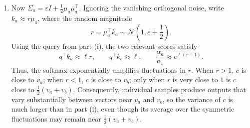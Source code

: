 \documentclass[11pt, a4paper, oneside]{article}
\begin{document}
\begin{enumerate}[label=(\alph*), left=0pt, labelsep=1em, itemsep=1em]
\begin{enumerate}[label=\roman*., left=0pt, labelsep=1em, itemsep=1em]
        $c\approx\frac12(v_a+v_b)$. To make the conditions on $\ell$ precise,
        first note that the random score perturbation $\delta_i^\top q$ is a
        linear projection of a Gaussian vector and is therefore Gaussian. Its
        mean and variance are
        \[
            \mathbb E[\delta_i^\top q]=0,
            \qquad
            \operatorname{Var}(\delta_i^\top q)
            =q^\top(\varepsilon I)q
            =\varepsilon\lVert q\rVert^2
            =2\varepsilon\ell^2,
        \]
        where $\lVert q\rVert^2=\ell^2\lVert\mu_a+\mu_b\rVert^2
        =2\ell^2$. Hence
        \[
            \delta_i^\top q\sim
            \mathcal N(0,2\varepsilon\ell^2),
        \]
        whose standard deviation is $\sqrt{2}\ell\sqrt{\varepsilon}$.
        We may thus choose
        \[
            \log(n-2)\ll\ell\ll\varepsilon^{-1/2}.
        \]
        The lower bound implies $e^\ell\gg n-2$, suppressing the total
        contribution of the irrelevant keys. The upper bound is equivalent to
        $\ell\sqrt{\varepsilon}\ll1$, ensuring that the random score
        perturbations are small and that the scores of $k_a$ and $k_b$ remain
        approximately equal.

        \item Now
        $\Sigma_a=\varepsilon I+\frac12\mu_a\mu_a^\top$. Ignoring the
        vanishing orthogonal noise, write $k_a\approx r\mu_a$, where the random
        magnitude
        \[
            r=\mu_a^\top k_a
            \sim\mathcal N\!\left(1,\varepsilon+\frac12\right).
        \]
        Using the query from part (i), the two relevant scores satisfy
        \[
            q^\top k_a\approx\ell r,
            \qquad q^\top k_b\approx\ell,
            \qquad
            \frac{\alpha_a}{\alpha_b}\approx e^{\ell(r-1)}.
        \]
        Thus, the softmax exponentially amplifies fluctuations in $r$. When
        $r>1$, $c$ is close to $v_a$; when $r<1$, $c$ is close to $v_b$; only
        when $r$ is very close to $1$ is $c$ close to
        $\frac12(v_a+v_b)$. Consequently, individual samples produce outputs
        that vary substantially between vectors near $v_a$ and $v_b$, so the
        variance of $c$ is much larger than in part (i), even though its average
        over the symmetric fluctuations may remain near
        $\frac12(v_a+v_b)$.
    \end{enumerate}


\end{enumerate}
\end{document}
